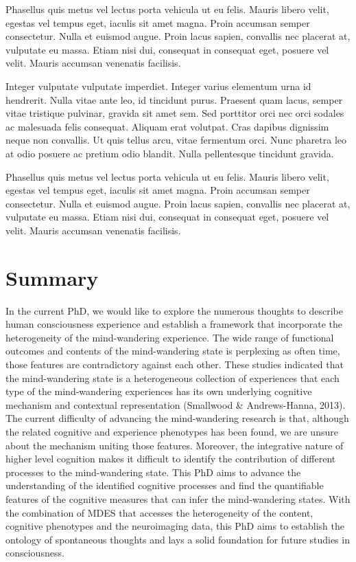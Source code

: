 Phasellus quis metus vel lectus porta vehicula ut eu felis. Mauris libero velit, egestas vel tempus eget, iaculis sit amet magna. Proin accumsan semper consectetur. Nulla et euismod augue. Proin lacus sapien, convallis nec placerat at, vulputate eu massa. Etiam nisi dui, consequat in consequat eget, posuere vel velit. Mauris accumsan venenatis facilisis.

Integer vulputate vulputate imperdiet. Integer varius elementum urna id hendrerit. Nulla vitae ante leo, id tincidunt purus. Praesent quam lacus, semper vitae tristique pulvinar, gravida sit amet sem. Sed porttitor orci nec orci sodales ac malesuada felis consequat. Aliquam erat volutpat. Cras dapibus dignissim neque non convallis. Ut quis tellus arcu, vitae fermentum orci. Nunc pharetra leo at odio posuere ac pretium odio blandit. Nulla pellentesque tincidunt gravida. 

Phasellus quis metus vel lectus porta vehicula ut eu felis. Mauris libero velit, egestas vel tempus eget, iaculis sit amet magna. Proin accumsan semper consectetur. Nulla et euismod augue. Proin lacus sapien, convallis nec placerat at, vulputate eu massa. Etiam nisi dui, consequat in consequat eget, posuere vel velit. Mauris accumsan venenatis facilisis.

\section{Summary}

In the current PhD, we would like to explore the numerous thoughts to describe human consciousness experience and establish a framework that incorporate the heterogeneity of the mind-wandering experience. The wide range of functional outcomes and contents of the mind-wandering state is perplexing as often time, those features are contradictory against each other. These studies indicated that the mind-wandering state is a heterogeneous collection of experiences that each type of the mind-wandering experiences has its own underlying cognitive mechanism and contextual representation (Smallwood \& Andrews-Hanna, 2013). The current difficulty of advancing the mind-wandering research is that, although the related cognitive and experience phenotypes has been found, we are unsure about the mechanism uniting those features. Moreover, the integrative nature of higher level cognition makes it difficult to identify the contribution of different processes to the mind-wandering state. This PhD aims to advance the understanding of the identified cognitive processes and find the quantifiable features of the cognitive measures that can infer the mind-wandering states. With the combination of MDES that accesses the heterogeneity of the content, cognitive phenotypes and the neuroimaging data, this PhD aims to establish the ontology of spontaneous thoughts and lays a solid foundation for future studies in consciousness. 
